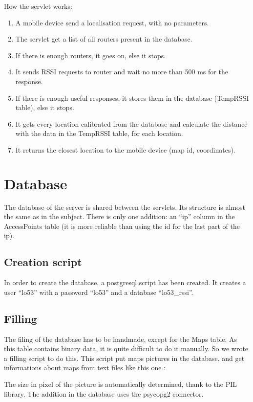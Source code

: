 How the servlet works:
\begin{enumerate}
    \item A mobile device send a localisation request, with no parameters.
    \item The servlet get a list of all routers present in the database.
    \item If there is enough routers, it goes on, else it stops.
    \item It sends RSSI requests to router and wait no more than 500 ms for the
        response.
    \item If there is enough useful responses, it stores them in the database
        (TempRSSI table), else it stops.
    \item It gets every location calibrated from the database and calculate the
        distance with the data in the TempRSSI table, for each location.
    \item It returns the closest location to the mobile device (map id,
        coordinates).
\end{enumerate}


    \section{Database}

The database of the server is shared between the servlets. Its structure is
almost the same as in the subject. There is only one addition: an ``ip'' column
in the AccessPoints table (it is more reliable than using the id for the last
part of the ip).

        \subsection{Creation script}

In order to create the database, a postgresql script has been created. It
creates a user ``lo53'' with a password ``lo53'' and a database ``lo53\_rssi''.

        \subsection{Filling}

The filing of the database has to be handmade, except for the Maps table. As
this table contains binary data, it is quite difficult to do it manually. So we
wrote a filling script to do this. This script put maps pictures in the
database, and get informations about maps from text files like this one :



The size in pixel of the picture is automatically determined, thank to the PIL
library. The addition in the database uses the psycopg2 connector.
